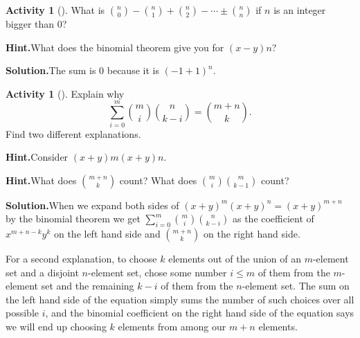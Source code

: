 \documentclass[10pt,]{book}
\theoremstyle{plain}
\theoremstyle{definition}
\newtheorem{activity}[project]{Activity}
\numberwithin{equation}{chapter}
\begin{document}
\begin{activity}[]\label{activity-56}
What is \(\binom{n}{0}-\binom{n}{1}+\binom{n}{2}-\cdots \pm
\binom{n}{n}\) if \(n\) is an integer bigger than 0?%
\par\medskip\noindent%
\textbf{Hint.}\quad What does the binomial theorem give you for \((x − y)n\)?%
\par\medskip\noindent%
\textbf{Solution.}\quad The sum is \(0\) because it is \((-1+1)^n\).%
\end{activity}
\begin{activity}[]\label{activity-57}
Explain why%
\begin{equation*}
\sum_{i=0}^m\binom{m}{i}\binom{n}{k-i} = \binom{m+n}{k}.
\end{equation*}
Find two different explanations.%
\par\medskip\noindent%
\textbf{Hint.}\quad Consider \((x + y)m (x + y)n\).%
\par\medskip\noindent%
\textbf{Hint.}\quad What does \(\binom{m+n}{k}\) count? What does \(\binom{m}{i}\binom{m}{k-1}\) count?%
\par\medskip\noindent%
\textbf{Solution.}\quad When we expand both sides of \((x+y)^m(x+y)^n=(x+y)^{m+n}\) by the binomial theorem we get \(\sum_{i=0}^m\binom{m}{i}\binom{n}{k-i}\) as the coefficient of \(x^{m+n-k}y^k\) on the left hand side and \(\binom{m+n}{k}\) on the right hand side.%
\par
For a second explanation, to choose \(k\) elements out of the union of an \(m\)-element set and a disjoint \(n\)-element set, chose some number \(i\le m\) of them from the \(m\)-element set and the remaining \(k-i\) of them from the \(n\)-element set. The sum on the left hand side of the equation simply sums the number of such choices over all possible \(i\), and the binomial coefficient on the right hand side of the equation says we will end up choosing \(k\) elements from among our \(m+n\) elements.%
\end{activity}
\end{document}

